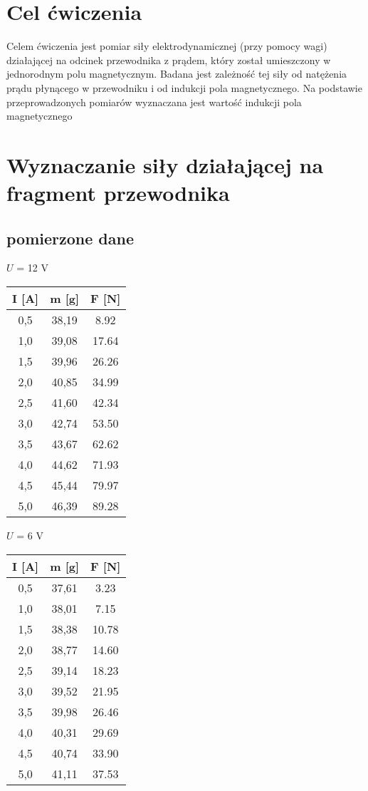 \documentclass{article}
\begin{document}
\section{Cel ćwiczenia}
Celem ćwiczenia jest pomiar siły elektrodynamicznej (przy pomocy wagi) działającej na odcinek przewodnika z prądem, który został umieszczony w jednorodnym polu magnetycznym. Badana jest zależność tej siły od natężenia prądu płynącego w przewodniku i od indukcji pola magnetycznego. Na podstawie przeprowadzonych pomiarów wyznaczana jest wartość indukcji pola magnetycznego

\section{Wyznaczanie siły działającej na fragment przewodnika}
\subsection{pomierzone dane}

$U$ = 12 V
\begin{center}
\begin{tabular}{ c | c | c}
I [A] & m [g] & F [N]\\
\hline
0,5 & 38,19  & 8.92\\
1,0 & 39,08  & 17.64\\
1,5 & 39,96  & 26.26\\
2,0 & 40,85  & 34.99\\
2,5 & 41,60  & 42.34\\
3,0 & 42,74  & 53.50\\
3,5 & 43,67  & 62.62\\
4,0 & 44,62  & 71.93\\
4,5 & 45,44  & 79.97\\
5,0 & 46,39  & 89.28\\
\end{tabular}
\end{center}

$U$ = 6 V
\begin{center}
\begin{tabular}{ c | c | c}
I [A] & m [g] & F [N]\\
\hline
0,5 & 37,61  & 3.23\\
1,0 & 38,01  & 7.15\\
1,5 & 38,38  & 10.78\\
2,0 & 38,77  & 14.60\\
2,5 & 39,14  & 18.23\\
3,0 & 39,52  & 21.95\\
3,5 & 39,98  & 26.46\\
4,0 & 40,31  & 29.69\\
4,5 & 40,74  & 33.90\\
5,0 & 41,11  & 37.53\\
\end{tabular}
\end{center}
\end{document}
